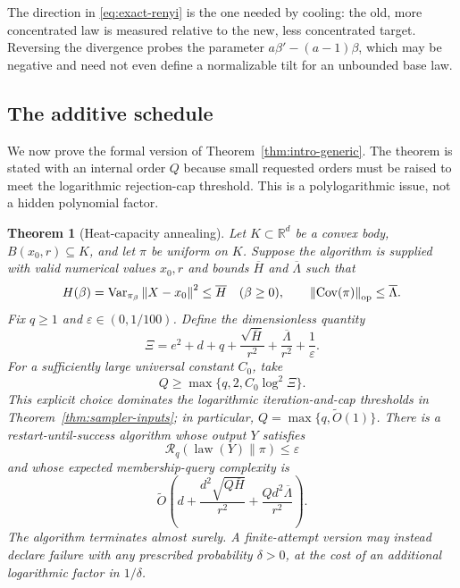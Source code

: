 \documentclass[11pt]{article}
\newtheorem{theorem}{Theorem}[section]
\theoremstyle{remark}
\newcommand{\R}{\mathbb R}
\newcommand{\1}{\bm 1}
\newcommand{\eps}{\varepsilon}
\newcommand{\Cov}{\operatorname{Cov}}
\newcommand{\Var}{\operatorname{Var}}
\newcommand{\law}{\operatorname{law}}
\newcommand{\norm}[1]{\left\lVert #1\right\rVert}
\begin{document}
The direction in \eqref{eq:exact-renyi} is the one needed by cooling:
the old, more concentrated law is measured relative to the new, less
concentrated target.  Reversing the divergence probes the parameter
$a\beta'-(a-1)\beta$, which may be negative and need not even define a
normalizable tilt for an unbounded base law.

\subsection{The additive schedule}

We now prove the formal version of
Theorem~\ref{thm:intro-generic}.  The theorem is stated with an internal
order $Q$ because small requested orders must be raised to meet the
logarithmic rejection-cap threshold.  This is a polylogarithmic issue,
not a hidden polynomial factor.

\begin{theorem}[Heat-capacity annealing]
\label{thm:algorithm-main}
Let $K\subset\R^d$ be a convex body, $B(x_0,r)\subseteq K$, and let
$\pi$ be uniform on $K$.  Suppose the algorithm is supplied with valid
numerical values $x_0,r$ and bounds $\overline H$ and
$\overline\Lambda$ such that
\begin{equation}\label{eq:Hbar-assumption}
  H(\beta)=\Var_{\pi_\beta}\norm{X-x_0}^2\leq\overline H
  \quad(\beta\geq0),
  \qquad
  \norm{\Cov(\pi)}_{\rm op}\leq\overline\Lambda.
\end{equation}
Fix $q\geq1$ and $\eps\in(0,1/100)$.  Define the dimensionless quantity
\[
  \Xi=e^2+d+q+\frac{\sqrt{\overline H}}{r^2}
        +\frac{\overline\Lambda}{r^2}+\frac1\eps.
\]
For a sufficiently large universal constant $C_0$, take
\begin{equation}\label{eq:cap-conditions}
  Q\geq\max\{q,2,C_0\log^2\Xi\}.
\end{equation}
This explicit choice dominates the logarithmic iteration-and-cap
thresholds in Theorem~\ref{thm:sampler-inputs}; in particular,
$Q=\max\{q,\widetilde O(1)\}$.  There is a restart-until-success
algorithm whose output $Y$ satisfies
\[
  \mathcal R_q(\law(Y)\|\pi)\leq\eps
\]
and whose expected membership-query complexity is
\begin{equation}\label{eq:generic-query-bound}
  \widetilde O\!\left(
      d+\frac{d^2\sqrt{Q\overline H}}{r^2}
      +\frac{Qd^2\overline\Lambda}{r^2}
  \right).
\end{equation}
The algorithm terminates almost surely.  A finite-attempt version may
instead declare failure with any prescribed probability $\delta>0$,
at the cost of an additional logarithmic factor in $1/\delta$.
\end{theorem}
\end{document}
